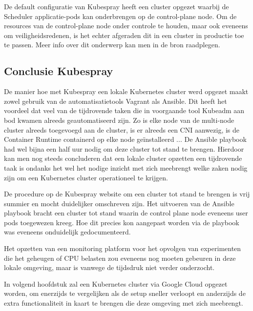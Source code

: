 De default configuratie van Kubespray heeft een cluster opgezet waarbij de Scheduler applicatie-pods kan onderbrengen op de control-plane node. Om de resources van de control-plane node onder controle te houden, maar ook eveneens om veiligheidsredenen, is het echter afgeraden dit in een cluster in productie toe te passen. Meer info over dit onderwerp kan men in de bron raadplegen. \autocite{Bailey2016}

\subsection{Conclusie Kubespray}

De manier hoe met Kubespray een lokale Kubernetes cluster werd opgezet maakt zowel gebruik van de automatisatietools Vagrant als Ansible. Dit heeft het voordeel dat veel van de tijdrovende taken die in voorgaande tool Kubeadm aan bod kwamen alreeds geautomatiseerd zijn. Zo is elke node van de multi-node cluster alreeds toegevoegd aan de cluster, is er alreeds een CNI aanwezig, is de Container Runtime containerd op elke node geïnstalleerd ... De Ansible playbook had wel bijna een half uur nodig om deze cluster tot stand te brengen. Hierdoor kan men nog steeds concluderen dat een lokale cluster opzetten een tijdrovende taak is ondanks het wel het nodige inzicht met zich meebrengt welke zaken nodig zijn om een Kubernetes cluster operationeel te krijgen. 

De procedure op de Kubespray website om een cluster tot stand te brengen is vrij summier en mocht duidelijker omschreven zijn. Het uitvoeren van de Ansible playbook bracht een cluster tot stand waarin de control plane node eveneens user pods toegewezen kreeg. Hoe dit precies kon aangepast worden via de playbook was eveneens onduidelijk gedocumenteerd. 

Het opzetten van een monitoring platform voor het opvolgen van experimenten die het geheugen of CPU belasten zou eveneens nog moeten gebeuren in deze lokale omgeving, maar is vanwege de tijdsdruk niet verder onderzocht.  

In volgend hoofdstuk zal een Kubernetes cluster via Google Cloud opgezet worden, om enerzijds te vergelijken als de setup sneller verloopt en anderzijds de extra functionaliteit in kaart te brengen die deze omgeving met zich meebrengt.